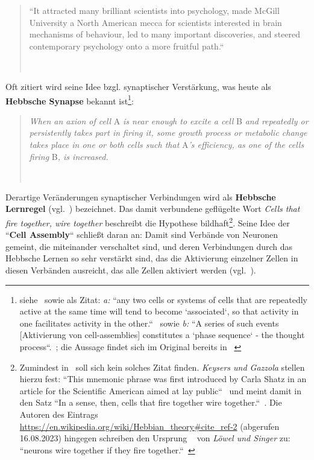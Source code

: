 \blockquote[{~\cite[1]{Kle99}}]{
    ``It attracted many
    brilliant scientists into psychology, made McGill University a North American mecca for scientists interested in brain mechanisms of behaviour, led to many important discoveries, and steered contemporary psychology onto a more fruitful path.``
}

Oft zitiert wird seine Idee bzgl. synaptischer Verstärkung, was heute als \textbf{Hebbsche Synapse} bekannt ist\footnote{
    siehe~\cite[43]{AR88} sowie als Zitat: \textit{a:} ``any two cells or systems of cells that are repeatedly active at the same time will tend to become `associated`, so that activity in one facilitates activity in the other.``~\cite[52]{Heb88} sowie \textit{b:} ``A series of such events [Aktivierung von cell-assemblies] constitutes a `phase sequence` - the thought process``.~\cite[48]{Heb88}; die Aussage findet sich im Original bereits in ~\cite[xi-xix, ``Introduction``]{Heb49}
}:

\blockquote[{~\cite[50; Hervorhebung i.O.]{Heb88}}]{
    \textit{When an axion of cell} A \textit{is near enough to excite a cell} B \textit{and repeatedly or persistently takes part in firing it, some growth process or metabolic change takes place in one or both cells such that} A\textit{'s efficiency, as one of the cells firing} B\textit{, is increased.}
}


Derartige Veränderungen synaptischer Verbindungen wird als \textbf{Hebbsche Lernregel} (vgl.~\cite[985]{BCP18}) bezeichnet.
Das damit verbundene geflügelte Wort \textit{Cells that fire together, wire together} beschreibt die Hypothese bildhaft\footnote{
    Zumindest in~\cite{Heb49} soll sich kein solches Zitat finden. \textit{Keysers und Gazzola} stellen hierzu fest: ``This mnemonic phrase was first introduced by Carla Shatz in an article for the Scientific American aimed at lay public``~\cite[2, Fussnotenmarker entfernt]{KG14} und meint damit in~\cite{Sha92} den Satz ``In a sense, then, cells that fire together wire together.``~\cite[64]{Sha92}. Die Autoren des Eintrags \url{https://en.wikipedia.org/wiki/Hebbian\_theory\#cite\_ref-2} (abgerufen 16.08.2023) hingegen schreiben den Ursprung ~\cite{LS92} von \textit{Löwel und Singer} zu: ``neurons wire together if they fire together.``~\cite[211]{LS92}
}.
Seine Idee der ``\textbf{Cell Assembly}`` schließt daran an: Damit sind Verbände von Neuronen gemeint, die miteinander verschaltet sind, und deren Verbindungen durch das Hebbsche Lernen so sehr verstärkt sind, das die Aktivierung einzelner Zellen in diesen Verbänden ausreicht, das alle Zellen aktiviert werden (vgl.~\cite[907 f.]{BCP18}).

